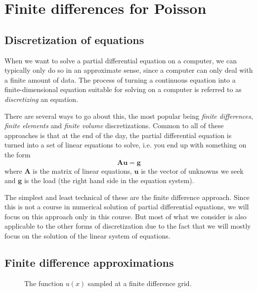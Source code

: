 \chapter{Finite differences for Poisson}

\section{Discretization of equations}

When we want to solve a partial differential equation on a computer, we can
typically only do so in an approximate sense, since a computer can only deal
with a finite amount of data. The process of turning a continuous equation into
a finite-dimensional equation suitable for solving on a computer is referred to
as \emph{discretizing} an equation.

There are several ways to go about this, the most popular being \emph{finite
differences}, \emph{finite elements} and \emph{finite volume} discretizations.
Common to all of these approaches is that at the end of the day, the partial
differential equation is turned into a set of linear equations to solve, i.e.
you end up with something on the form
\[
  \bm A \bm u = \bm g
\]
where $\bm A$ is the matrix of linear equations, $\bm u$ is the vector of
unknowns we seek and $\bm g$ is the load (the right hand side in the equation
system).

The simplest and least technical of these are the finite difference approach.
Since this is not a course in numerical solution of partial differential
equations, we will focus on this approach only in this course. But most of what
we consider is also applicable to the other forms of discretization due to the
fact that we will mostly focus on the solution of the linear system of
equations.

\section{Finite difference approximations}

\begin{figure}
  \centering
  
  \caption{The function $u(x)$ sampled at a finite difference grid.}
  \label{fig:FiniteDifference}
\end{figure}

